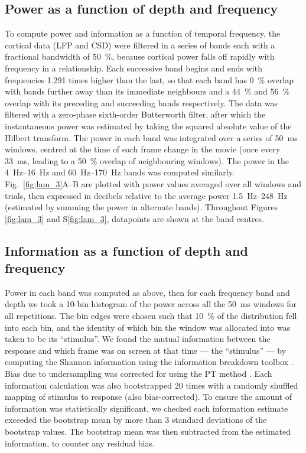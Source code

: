\subsection{Power as a function of depth and frequency}
To compute power and information as a function of temporal frequency, the cortical data (\ac{LFP} and \ac{CSD}) were filtered in a series of bands each with a fractional bandwidth of \SI{50}{\percent}, because cortical power falls off rapidly with frequency in a  relationship.
Each successive band begins and ends with frequencies 1.291 times higher than the last, so that each band has \SI{0}{\percent} overlap with bands further away than its immediate neighbours and a \SI{44}{\percent} and \SI{56}{\percent} overlap with its preceding and succeeding bands respectively.
The data was filtered with a zero-phase sixth-order Butterworth filter, after which the instantaneous power was estimated by taking the squared absolute value of the Hilbert transform.
The power in each band was integrated over a series of \SI{50}{\milli\second} windows, centred at the time of each frame change in the movie (once every \SI{33}{\milli\second}, leading to a \SI{50}{\percent} overlap of neighbouring windows).
The power in the \SIrange{4}{16}{Hz} and \SIrange{60}{170}{Hz} bands was computed similarly.
Fig.~\ref{fig:lam_3}A--B are plotted with power values averaged over all windows and trials, then expressed in decibels relative to the average power \SIrange{1.5}{248}{Hz} (estimated by summing the power in alternate bands).
Throughout Figures \ref{fig:lam_3} and S\ref{fig:lam_3}, datapoints are shown at the band centres.

\subsection{Information as a function of depth and frequency}
Power in each band was computed as above, then for each frequency band and depth we took a 10-bin histogram of the power across all the \SI{50}{\milli\second} windows for all repetitions.
The bin edges were chosen such that \SI{10}{\percent} of the distribution fell into each bin, and the identity of which bin the window was allocated into was taken to be its ``stimulus''.
We found the mutual information between the response and which frame was on screen at that time --- the ``stimulus'' --- by computing the Shannon information using the information breakdown toolbox \citep{Magri2009}.
Bias due to undersampling was corrected for using the \ac{PT} method \citep{Treves1995}.
Each information calculation was also bootstrapped 20 times with a randomly shuffled mapping of stimulus to response (also bias-corrected).
To ensure the amount of information was statistically significant, we checked each information estimate exceeded the bootstrap mean by more than 3 standard deviations of the bootstrap values.
The bootstrap mean was then subtracted from the estimated information, to counter any residual bias.


